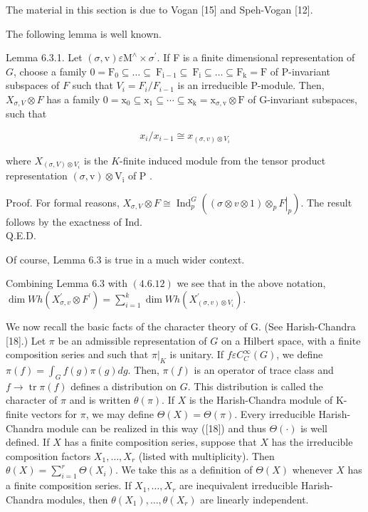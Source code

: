 \documentclass[10pt]{article}
\begin{document}
The material in this section is due to Vogan [15] and Speh-Vogan [12].

The following lemma is well known.

Lemma 6.3.1. Let $(\sigma, \mathrm{v}) \varepsilon \mathrm{M}^{\wedge} \times \sigma{ }^{\prime}$. If F is a finite dimensional representation of $G$, choose a family $0=\mathrm{F}_{0} \subseteq \ldots \subseteq \mathrm{~F}_{\mathrm{i}-1} \subseteq \mathrm{~F}_{\mathrm{i}} \subseteq \ldots \subseteq \mathrm{F}_{\mathrm{k}}=\mathrm{F}$ of P-invariant subspaces of $F$ such that $V_{i}=F_{i} / F_{i-1}$ is an irreducible P-module. Then, $X_{\sigma, V} \otimes F$ has a family $0=\mathrm{x}_{0} \subseteq \mathrm{x}_{1} \subseteq \cdots \subseteq \mathrm{x}_{\mathrm{k}}=\mathrm{x}_{\sigma, \mathrm{v}} \otimes \mathrm{F}$ of G-invariant subspaces, such that


\begin{equation*}
x_{i} / x_{i-1} \cong x_{(\sigma, v) \otimes V_{i}} \tag{6.3.1}
\end{equation*}


where $X_{(\sigma, V) \otimes V_{i}}$ is the $K$-finite induced module from the tensor product representation $(\sigma, \mathrm{v}) \otimes \mathrm{V}_{\mathrm{i}}$ of P .

Proof. For formal reasons, $X_{\sigma, V} \otimes F \cong \operatorname{Ind}_{p}^{G}\left(\left.(\sigma \otimes v \otimes 1) \otimes_{p} F\right|_{p}\right)$. The result follows by the exactness of Ind.\\
Q.E.D.

Of course, Lemma 6.3 is true in a much wider context.

Combining Lemma 6.3 with $(4.6 .12)$ we see that in the above notation, $\operatorname{dim} W h\left(X_{\sigma, v}^{\prime} \otimes F^{\prime}\right)=\sum_{i=1}^{k} \operatorname{dim} W h\left(X_{(\sigma, v) \otimes V_{i}}^{\prime}\right)$.

We now recall the basic facts of the character theory of G. (See Harish-Chandra [18].) Let $\pi$ be an admissible representation of $G$ on a Hilbert space, with a finite composition series and such that $\left.\pi\right|_{K}$ is unitary. If $f \varepsilon C_{C}^{\infty}(G)$, we define $\pi(f)=\int_{G} f(g) \pi(g) d g$. Then, $\pi(f)$ is an operator of trace class and $f \rightarrow \operatorname{tr} \pi(f)$ defines a distribution on $G$. This distribution is called the character of $\pi$ and is written $\theta(\pi)$. If $X$ is the Harish-Chandra module of K-finite vectors for $\pi$, we may define $\Theta(X)=\Theta(\pi)$. Every irreducible Harish-Chandra module can be realized in this way ([18]) and thus $\Theta(\cdot)$ is well defined. If $X$ has a finite composition series, suppose that $X$ has the irreducible composition factors $X_{1}, \ldots, X_{r}$ (listed with multiplicity). Then\\
$\theta(X)=\sum_{i=1}^{r} \Theta\left(X_{i}\right)$. We take this as a definition of $\Theta(X)$ whenever $X$ has a finite composition series. If $X_{1}, \ldots, X_{r}$ are inequivalent irreducible Harish-Chandra modules, then $\theta\left(X_{1}\right), \ldots, \theta\left(X_{r}\right)$ are linearly independent.
\end{document}
